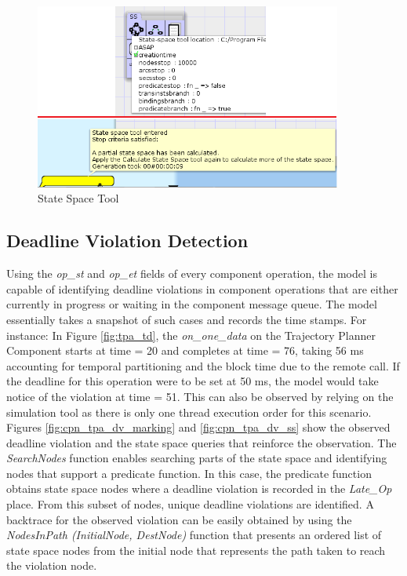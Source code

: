 \begin{figure}[ht]
\centering
\includegraphics[width=0.9\textwidth]{./figs/SSS}
\caption{State Space Tool}
\label{fig:sss}
\vspace{-0.2in}
\end{figure}
\vspace{0.1in} 

\subsection{Deadline Violation Detection}
Using the \emph{op\_st} and \emph{op\_et} fields of every component operation, the model is capable of identifying deadline violations in component operations that are either currently in progress or waiting in the component message queue. The model essentially takes a snapshot of such cases and records the time stamps. For instance: In Figure \ref{fig:tpa_td}, the \emph{on\_one\_data} on the Trajectory Planner Component starts at time = 20 and completes at time = 76, taking 56 ms accounting for temporal partitioning and the block time due to the remote call. If the deadline for this operation were to be set at 50 ms, the model would take notice of the violation at time = 51. This can also be observed by relying on the simulation tool as there is only one thread execution order for this scenario. Figures \ref{fig:cpn_tpa_dv_marking} and \ref{fig:cpn_tpa_dv_ss} show the observed deadline violation and the state space queries that reinforce the observation. The \emph{SearchNodes} function enables searching parts of the state space and identifying nodes that support a predicate function. In this case, the predicate function obtains state space nodes where a deadline violation is recorded in the \emph{Late\_Op} place. From this subset of nodes, unique deadline violations are identified. A backtrace for the observed violation can be easily obtained by using the \emph{NodesInPath (InitialNode, DestNode)} function that presents an ordered list of state space nodes from the initial node that represents the path taken to reach the violation node.

